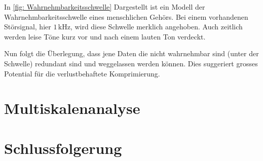 \begin{refsection}
In \autoref{fig: Wahrnehmbarkeitsschwelle} Dargestellt ist ein Modell der Wahrnehmbarkeitsschwelle eines menschlichen Gehörs.
Bei einem vorhandenen Störsignal, hier $1\,\text{kHz}$, wird diese Schwelle merklich angehoben.
Auch zeitlich werden leise Töne kurz vor und nach einem lauten Ton verdeckt.

Nun folgt die Überlegung, dass jene Daten die nicht wahrnehmbar sind (unter der Schwelle) redundant sind und weggelassen werden können.
Dies suggeriert grosses Potential für die verlustbehaftete Komprimierung.

\section{Multiskalenanalyse}

\rhead{}
\section{Schlussfolgerung}

\printbibliography[heading=subbibliography]
\end{refsection}

